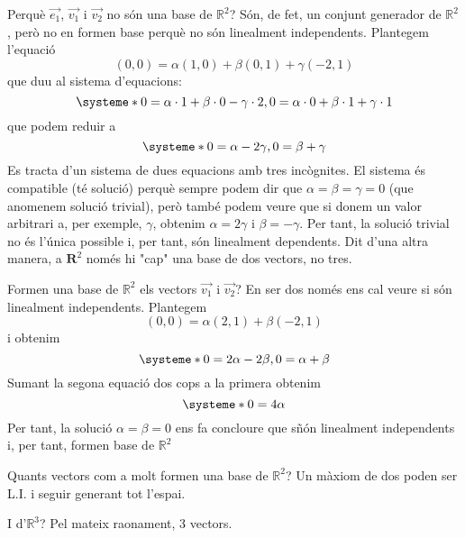 \begin{llista}
\item Perquè $\overrightarrow{e_1}$, $\overrightarrow{v_1}$ i $\overrightarrow{v_2}$ no són una base de $\mathbb{R}^2$?
Són, de fet, un conjunt generador de $\mathbb{R}^2$, però no en formen base perquè no són linealment independents. Plantegem l'equació
\[(0,0) = \alpha (1,0) + \beta (0,1) +\gamma (-2,1)\]
que duu al sistema d'equacions:
\[
  \systeme*{0=\alpha\cdot 1 + \beta\cdot 0 - \gamma\cdot 2, 0=\alpha\cdot 0 + \beta\cdot 1 + \gamma \cdot 1}
\]
que podem reduir a 
\[
  \systeme*{0=\alpha - 2\gamma, 0=\beta + \gamma}
\]
Es tracta d'un sistema de dues equacions amb tres incògnites. El sistema és compatible (té solució) perquè sempre podem dir que $\alpha=\beta=\gamma=0$ (que anomenem solució trivial), però també podem veure que si donem un valor arbitrari a, per exemple, $\gamma$, obtenim $\alpha=2\gamma$ i $\beta=-\gamma$. Per tant, la solució trivial no és l'única possible i, per tant, són linealment dependents. Dit d'una altra manera, a $\mathbf{R}^2$ només hi "cap" una base de dos vectors, no tres.
\item Formen una base de $\mathbb{R}^2$ els vectors $\overrightarrow{v_1}$ i $\overrightarrow{v_2}$?
En ser dos només ens cal veure si són linealment independents. Plantegem
\[(0,0) = \alpha (2,1) + \beta (-2,1) \]
i obtenim
\[
  \systeme*{0=2\alpha- 2 \beta, 0=\alpha + \beta}
\]
Sumant la segona equació dos cops a la primera obtenim
\[
  \systeme*{0=4\alpha }
\]
Per tant, la solució $\alpha=\beta=0$ ens fa concloure que sñón linealment independents i, per tant, formen base de $\mathbb{R}^2$
\item Quants vectors com a molt formen una base de $\mathbb{R}^2$?
Un màxiom de dos poden ser L.I. i seguir generant tot l'espai.
\item I d'$\mathbb{R}^3$?
Pel mateix raonament, 3 vectors.
\end{llista}
\blacksquare

